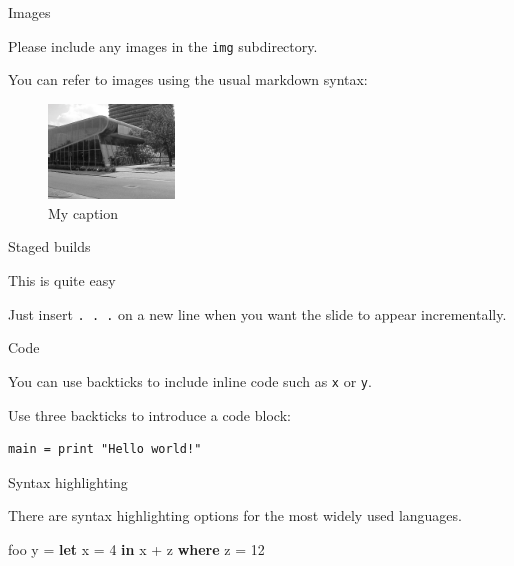 \documentclass[ignorenonframetext,]{beamer}
\newenvironment{Shaded}{}{}
\newcommand{\DecValTok}[1]{\textcolor[rgb]{0.25,0.63,0.44}{#1}}
\newcommand{\FunctionTok}[1]{\textcolor[rgb]{0.02,0.16,0.49}{#1}}
\newcommand{\KeywordTok}[1]{\textcolor[rgb]{0.00,0.44,0.13}{\textbf{#1}}}
\newcommand{\NormalTok}[1]{#1}
\begin{document}
\begin{frame}[fragile]{%
\protect\hypertarget{images}{%
Images}}

Please include any images in the \texttt{img} subdirectory.

You can refer to images using the usual markdown syntax:

\begin{figure}
\centering
\includegraphics[width=0.3\textwidth,height=\textheight]{./tex2pdf.10928/2a53e7c630fc34751833a1c375097acbc5c345fb.jpg}
\caption{My caption}
\end{figure}

\end{frame}

\begin{frame}[fragile]{%
\protect\hypertarget{staged-builds}{%
Staged builds}}

This is quite easy

\pause

Just insert \texttt{.\ .\ .} on a new line when you want the slide to
appear incrementally.

\end{frame}

\begin{frame}[fragile]{%
\protect\hypertarget{code}{%
Code}}

You can use backticks to include inline code such as \texttt{x} or
\texttt{y}.

Use three backticks to introduce a code block:

\begin{verbatim}
main = print "Hello world!"
\end{verbatim}

\end{frame}

\begin{frame}[fragile]{%
\protect\hypertarget{syntax-highlighting}{%
Syntax highlighting}}

There are syntax highlighting options for the most widely used
languages.

\begin{Shaded}
\begin{Highlighting}[]
\NormalTok{foo y }\FunctionTok{=} \KeywordTok{let}\NormalTok{ x }\FunctionTok{=} \DecValTok{4} \KeywordTok{in}\NormalTok{ x }\FunctionTok{+}\NormalTok{ z}
  \KeywordTok{where}
\NormalTok{  z }\FunctionTok{=} \DecValTok{12}
\end{Highlighting}
\end{Shaded}

\end{frame}
\end{document}
